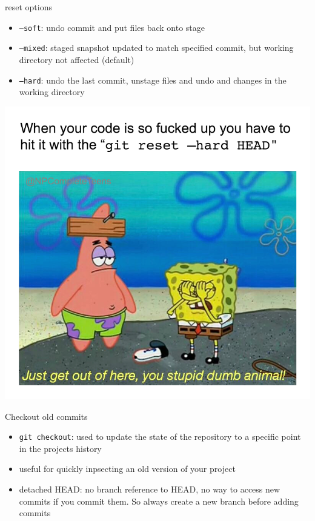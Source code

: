 \documentclass[12pt]{beamer}
\begin{document}
\begin{frame}{reset options}
\begin{itemize}
	\item \texttt{--soft}: undo commit and put files back onto stage
	\item \texttt{--mixed}: staged snapshot updated to match specified commit, but working directory not affected (default)
	\item \texttt{--hard}: undo the last commit, unstage files and undo and changes in the working directory
\end{itemize}
\begin{center}
	\includegraphics[width=0.4\linewidth]{hard_reset_meme}
\end{center}
\end{frame}

\begin{frame}{Checkout old commits}
\begin{itemize}
	\item \texttt{git checkout}: used to update the state of the repository to a specific point in the projects history
	\item useful for quickly inpsecting an old version of your project
	\item detached HEAD: no branch reference to HEAD, no way to access new commits if you commit them. So always create a new branch before adding commits
\end{itemize}
\end{frame}
\end{document}
